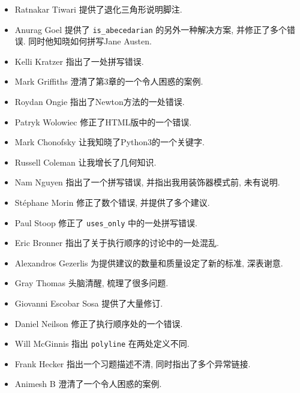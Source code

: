 \documentclass[10pt]{book}
\begin{document}
\begin{itemize}
\item Ratnakar Tiwari 提供了退化三角形说明脚注. 

\item Anurag Goel 提供了 \verb"is_abecedarian"
的另外一种解决方案, 并修正了多个错误. 同时他知晓如何拼写Jane Austen. 

\item Kelli Kratzer 指出了一处拼写错误. 

\item Mark Griffiths 澄清了第3章的一个令人困惑的案例. 

\item Roydan Ongie 指出了Newton方法的一处错误. 

\item Patryk Wolowiec 修正了HTML版中的一个错误. 

\item Mark Chonofsky 让我知晓了Python3的一个关键字. 

\item Russell Coleman 让我增长了几何知识. 

\item Nam Nguyen 指出了一个拼写错误, 并指出我用装饰器模式前, 未有说明. 

\item St\'{e}phane Morin 修正了数个错误, 并提供了多个建议. 

\item Paul Stoop 修正了 \verb+uses_only+ 中的一处拼写错误. 

\item Eric Bronner 指出了关于执行顺序的讨论中的一处混乱. 

\item Alexandros Gezerlis 为提供建议的数量和质量设定了新的标准, 深表谢意. 

\item Gray Thomas 头脑清醒, 梳理了很多问题.

\item Giovanni Escobar Sosa 提供了大量修订. 

\item Daniel Neilson 修正了执行顺序处的一个错误. 

\item Will McGinnis 指出 {\tt polyline} 在两处定义不同. 

\item Frank Hecker 指出一个习题描述不清, 同时指出了多个异常链接. 

\item Animesh B 澄清了一个令人困惑的案例. 


\end{itemize}
\end{document}
